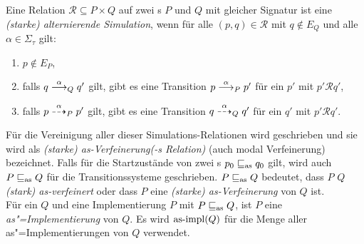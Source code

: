 \begin{Def}
  \label{SimDef}
  Eine Relation $\mathcal{R}\subseteq P \times Q$ auf zwei \MEIO{}s $P$ und $Q$
  mit gleicher Signatur ist eine \emph{(starke) alternierende Simulation}, wenn
  für alle $(p,q)\in \mathcal{R}$ mit $q\notin E_Q$ und alle $\alpha\in\Sigma
  _\tau$ gilt:
  \begin{enumerate}
    \item $p\notin E_P$,
    \item falls $q\must[\alpha]_Q q'$ gilt, gibt es eine Transition
      $p\must[\alpha]_P p'$ für ein $p'$ mit $p'\mathcal{R}q'$,
    \item falls $p\may[\alpha]_P p'$ gilt, gibt es eine Transition
      $q\may[\alpha]_Q q'$ für ein $q'$ mit $p'\mathcal{R}q'$.
  \end{enumerate}
  Für die Vereinigung aller dieser Simulations-Relationen wird \asRel{}
  geschrieben und sie wird als \emph{(starke) as-Verfeinerung(-s Relation)}
  (auch modal Verfeinerung) bezeichnet. Falls für die Startzustände von zwei
  \MEIO{}s $p_0\sqsubseteq _{\mathrm{as}} q_0$ gilt, wird auch $P\sqsubseteq _{\mathrm{as}} Q$ für die
  Transitionssysteme geschrieben. $P\sqsubseteq _{\mathrm{as}} Q$ bedeutet, dass $P$ $Q$
  \emph{(stark) as-verfeinert} oder dass $P$ eine \emph{(starke)
  as-Verfeinerung} von $Q$ ist.\\
  Für ein \MEIO{} $Q$ und eine Implementierung $P$ mit $P\sqsubseteq _{\mathrm{as}}{}Q$, ist
  $P$ eine \emph{as"=Implementierung} von $Q$. Es wird $\mathrm{as}\text{-}\mathrm{impl} (Q)$ für die
  Menge aller as"=Implementierungen von $Q$ verwendet.
\end{Def}

